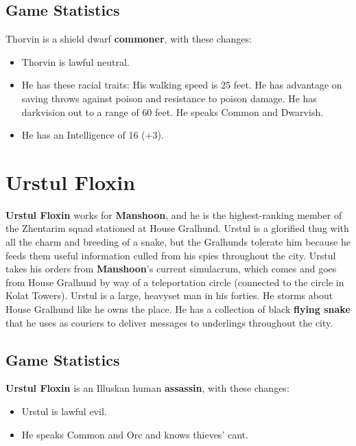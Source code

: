 \documentclass[10pt,a4paper,twoside,twocolumn,openany,nodeprecatedcode]{dndbook}
\begin{document}
\subsection{Game Statistics}
Thorvin is a shield dwarf \textbf{commoner}, with these changes:
\begin{itemize}

\item Thorvin is lawful neutral.
\item He has these racial traits: His walking speed is 25 feet. He has advantage on saving throws against poison and resistance to poison damage. He has darkvision out to a range of 60 feet. He speaks Common and Dwarvish.
\item He has an Intelligence of 16 (+3).
\end{itemize}


\section{Urstul Floxin}
\textbf{Urstul Floxin} works for \textbf{Manshoon}, and he is the highest-ranking member of the Zhentarim squad stationed at House Gralhund. Urstul is a glorified thug with all the charm and breeding of a snake, but the Gralhunds tolerate him because he feeds them useful information culled from his spies throughout the city. Urstul takes his orders from \textbf{Manshoon}'s current simulacrum, which comes and goes from House Gralhund by way of a teleportation circle (connected to the circle in Kolat Towers).
Urstul is a large, heavyset man in his forties. He storms about House Gralhund like he owns the place. He has a collection of black \textbf{flying snake} that he uses as couriers to deliver messages to underlings throughout the city.
\subsection{Game Statistics}
\textbf{Urstul Floxin} is an Illuskan human \textbf{assassin}, with these changes:
\begin{itemize}

\item Urstul is lawful evil.
\item He speaks Common and Orc and knows thieves' cant.
\end{itemize}
\end{document}
